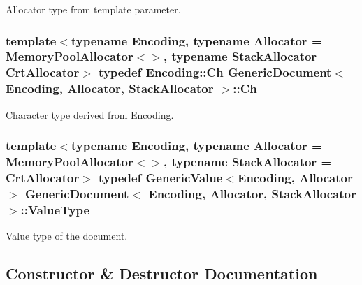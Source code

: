 Allocator type from template parameter. 

\subsubsection[{\texorpdfstring{Ch}{Ch}}]{\setlength{\rightskip}{0pt plus 5cm}template$<$typename Encoding, typename Allocator = Memory\+Pool\+Allocator$<$$>$, typename Stack\+Allocator = Crt\+Allocator$>$ typedef Encoding\+::\+Ch {\bf Generic\+Document}$<$ Encoding, Allocator, Stack\+Allocator $>$\+::{\bf Ch}}\hypertarget{classGenericDocument_a6f5b0b7b6626508d094ae67490269700}{}\label{classGenericDocument_a6f5b0b7b6626508d094ae67490269700}


Character type derived from Encoding. 

\subsubsection[{\texorpdfstring{Value\+Type}{ValueType}}]{\setlength{\rightskip}{0pt plus 5cm}template$<$typename Encoding, typename Allocator = Memory\+Pool\+Allocator$<$$>$, typename Stack\+Allocator = Crt\+Allocator$>$ typedef {\bf Generic\+Value}$<$Encoding, Allocator$>$ {\bf Generic\+Document}$<$ Encoding, Allocator, Stack\+Allocator $>$\+::{\bf Value\+Type}}\hypertarget{classGenericDocument_a8936205dc215dda029060d7e835e0549}{}\label{classGenericDocument_a8936205dc215dda029060d7e835e0549}


Value type of the document. 



\subsection{Constructor \& Destructor Documentation}
